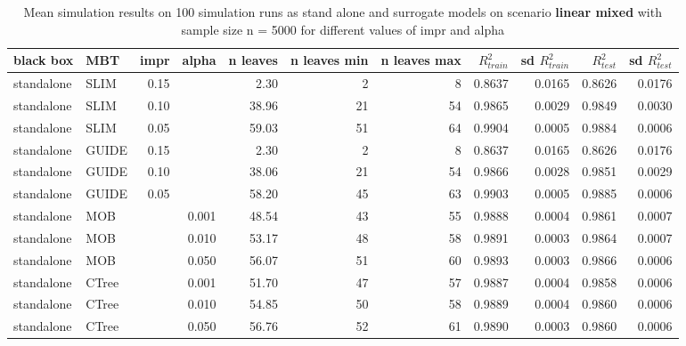 \begin{table}

\caption{Mean simulation results on 100 simulation runs as stand alone and surrogate models on scenario \textbf{linear mixed} with sample size n = 5000 for different values of impr and alpha}
\centering \tiny
\begin{tabular}[t]{l|l|r|r|r|r|r|r|r|r|r}
\hline
black box & MBT & impr & alpha & n leaves & n leaves min & n leaves max &  $R^2_{train}$ & sd $R^2_{train}$ & $R^2_{test}$ & sd $R^2_{test}$\\
\hline
standalone & SLIM & 0.15 & & 2.30 & 2 & 8 & 0.8637 & 0.0165 & 0.8626 & 0.0176\\
standalone & SLIM & 0.10 & & 38.96 & 21 & 54 & 0.9865 & 0.0029 & 0.9849 & 0.0030\\
standalone & SLIM & 0.05 & & 59.03 & 51 & 64 & 0.9904 & 0.0005 & 0.9884 & 0.0006\\
standalone & GUIDE & 0.15 & & 2.30 & 2 & 8 & 0.8637 & 0.0165 & 0.8626 & 0.0176\\
standalone & GUIDE & 0.10 & & 38.06 & 21 & 54 & 0.9866 & 0.0028 & 0.9851 & 0.0029\\
standalone & GUIDE & 0.05 & & 58.20 & 45 & 63 & 0.9903 & 0.0005 & 0.9885 & 0.0006\\
standalone & MOB & & 0.001 & 48.54 & 43 & 55 & 0.9888 & 0.0004 & 0.9861 & 0.0007\\
standalone & MOB & & 0.010 & 53.17 & 48 & 58 & 0.9891 & 0.0003 & 0.9864 & 0.0007\\
standalone & MOB & & 0.050 & 56.07 & 51 & 60 & 0.9893 & 0.0003 & 0.9866 & 0.0006\\
standalone & CTree & & 0.001 & 51.70 & 47 & 57 & 0.9887 & 0.0004 & 0.9858 & 0.0006\\
standalone & CTree & & 0.010 & 54.85 & 50 & 58 & 0.9889 & 0.0004 & 0.9860 & 0.0006\\
standalone & CTree & & 0.050 & 56.76 & 52 & 61 & 0.9890 & 0.0003 & 0.9860 & 0.0006\\


\end{tabular}
\end{table}
